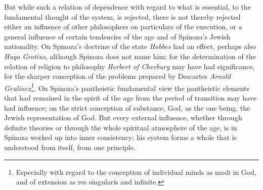 \documentclass[12pt,a4paper,openany]{book}
\begin{document}
But while such a relation of dependence with regard to what is
essential, to the fundamental thought of the system, is rejected, there
is not thereby rejected either an influence of other philosophers on
particulars of the execution, or a general influence of certain
tendencies of the age and of Spinoza's Jewish nationality. On Spinoza's
doctrine of the state \emph{Hobbes} had an effect, perhaps also
\emph{Hugo Grotius}, although Spinoza does not name him; for the
determination of the relation of religion to philosophy \emph{Herbert of
Cherbury} may have had significance, for the sharper conception of the
problems prepared by Descartes \emph{Arnold Geulincx}\footnote{Especially
with regard to the conception of individual minds as modi in God, and
of extension as res singularis and infinite.}. On Spinoza's pantheistic
fundamental view the pantheistic elements that had remained in the
spirit of the age from the period of transition may have had influence;
on the strict conception of substance, God, as the one being, the Jewish
representation of God. But every external influence, whether through
definite theories or through the whole spiritual atmosphere of the age,
is in Spinoza worked up into inner consistency; his system forms a whole
that is understood from itself, from one principle.
\end{document}
